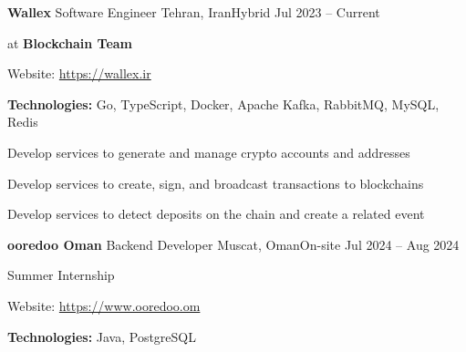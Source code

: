 \documentclass[]{awesome-cv}
\begin{document}
\vspace{-7mm}
\begin{cventries}
	\cventry
	{\textbf{Wallex}}
	{Software Engineer}
	{Tehran, Iran{\enskip\cdotp\enskip}Hybrid}
	{Jul 2023 – Current}
	{\begin{cvitems}
		\vspace{1mm}
		\item[] {\hspace{-9mm}} at \textbf{Blockchain Team}
		\vspace{1mm}
		\item[] {\hspace{-9mm} Website: \href{https://wallex.ir}{\textcolor{awesome}{https://wallex.ir}}}
		\vspace{1mm}
		\item {\textbf{Technologies:} Go, TypeScript, Docker, Apache Kafka, RabbitMQ, MySQL, Redis}
		\vspace{1mm}
		\item {Develop services to generate and manage crypto accounts and addresses}
		\vspace{1mm}
		\item {Develop services to create, sign, and broadcast transactions to blockchains}
		\vspace{1mm}
		\item {Develop services to detect deposits on the chain and create a related event}
	\end{cvitems}}
        \cventry
	{\textbf{ooredoo Oman}}
	{Backend Developer}
	{Muscat, Oman{\enskip\cdotp\enskip}On-site}
	{Jul 2024 – Aug 2024}
	{\begin{cvitems}
		\vspace{1mm}
		\item[] {\hspace{-9mm} Summer Internship}
        \vspace{1mm}
		\item[] {\hspace{-9mm} Website: \href{https://www.ooredoo.om}{\textcolor{awesome}{https://www.ooredoo.om}}}
		\vspace{1mm}
		\item {\textbf{Technologies:} Java, PostgreSQL}
	\end{cvitems}}

\end{cventries}
\end{document}
